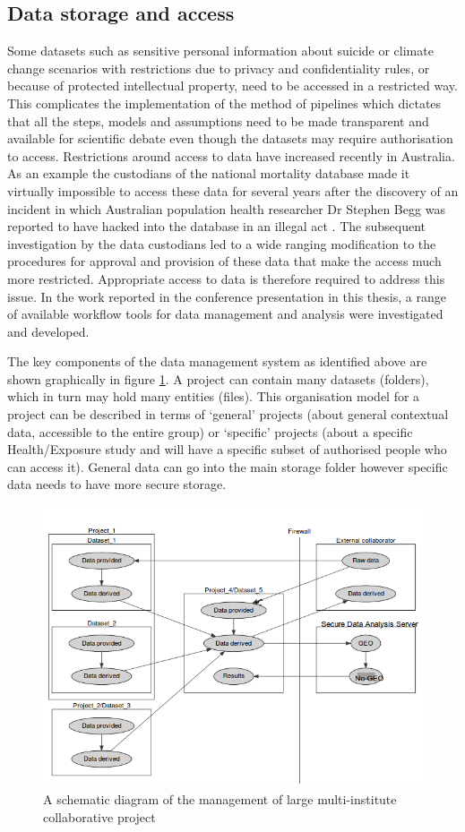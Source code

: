 \documentclass[11pt,a4paper]{article}
\begin{document}
\subsection{Data storage and access}\label{data-storage-and-access}

Some datasets such as sensitive personal information about suicide or
climate change scenarios with restrictions due to privacy and
confidentiality rules, or because of protected intellectual property,
need to be accessed in a restricted way. This complicates the
implementation of the method of pipelines which dictates that all the
steps, models and assumptions need to be made transparent and available
for scientific debate even though the datasets may require authorisation
to access. Restrictions around access to data have increased recently in
Australia. As an example the custodians of the national mortality
database made it virtually impossible to access these data for several
years after the discovery of an incident in which Australian population
health researcher Dr Stephen Begg was reported to have hacked into the
database in an illegal act \citep{OKeefe2007}. The subsequent investigation
by the data custodians led to a wide ranging modification to the
procedures for approval and provision of these data that make the access
much more restricted. Appropriate access to data is therefore required
to address this issue. In the work reported in the conference
presentation in this thesis, a range of available workflow tools for
data management and analysis were investigated and developed.

The key components of the  data management system as identified above are shown graphically in figure 
\ref{fig:file_name}.  A project can contain many datasets (folders), which in turn may hold many entities (files). This organisation model for a project can be described in terms of `general' projects (about general contextual data, accessible to the entire group) or `specific' projects (about a specific Health/Exposure study and will have a specific subset of authorised people who can access it).  General data can go into the main storage folder however specific data needs to have more secure storage.

\begin{figure}[!h]
\centering
\includegraphics[width=.8\textwidth]{images/file_name.png}
\caption{A schematic diagram of the management of large multi-institute collaborative project}
\label{fig:file_name}
\end{figure}
\clearpage
\end{document}
